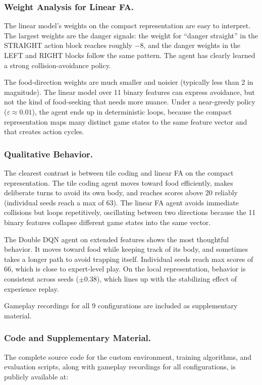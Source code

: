 \documentclass[letterpaper]{article}
\begin{document}
\subsubsection{Weight Analysis for Linear FA.}

The linear model's weights on the compact representation are easy to interpret. The largest weights are the danger signals: the weight for ``danger straight'' in the STRAIGHT action block reaches roughly $-8$, and the danger weights in the LEFT and RIGHT blocks follow the same pattern. The agent has clearly learned a strong collision-avoidance policy.

The food-direction weights are much smaller and noisier (typically less than 2 in magnitude). The linear model over 11 binary features can express avoidance, but not the kind of food-seeking that needs more nuance. Under a near-greedy policy ($\varepsilon \approx 0.01$), the agent ends up in deterministic loops, because the compact representation maps many distinct game states to the same feature vector and that creates action cycles.

\subsubsection{Qualitative Behavior.}

The clearest contrast is between tile coding and linear FA on the compact representation. The tile coding agent moves toward food efficiently, makes deliberate turns to avoid its own body, and reaches scores above 20 reliably (individual seeds reach a max of 63). The linear FA agent avoids immediate collisions but loops repetitively, oscillating between two directions because the 11 binary features collapse different game states into the same vector.

The Double DQN agent on extended features shows the most thoughtful behavior. It moves toward food while keeping track of its body, and sometimes takes a longer path to avoid trapping itself. Individual seeds reach max scores of 66, which is close to expert-level play. On the local representation, behavior is consistent across seeds ($\pm 0.38$), which lines up with the stabilizing effect of experience replay.

Gameplay recordings for all 9 configurations are included as supplementary material.

\subsubsection{Code and Supplementary Material.}
The complete source code for the custom environment, training algorithms, and evaluation scripts, along with gameplay recordings for all configurations, is publicly available at:
\end{document}
